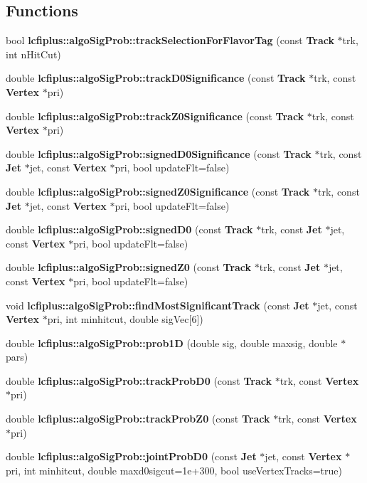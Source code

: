 \subsection*{Functions}
\begin{DoxyCompactItemize}
\item 
bool {\bf lcfiplus\-::algo\-Sig\-Prob\-::track\-Selection\-For\-Flavor\-Tag} (const {\bf Track} $\ast$trk, int n\-Hit\-Cut)
\item 
double {\bf lcfiplus\-::algo\-Sig\-Prob\-::track\-D0\-Significance} (const {\bf Track} $\ast$trk, const {\bf Vertex} $\ast$pri)
\item 
double {\bf lcfiplus\-::algo\-Sig\-Prob\-::track\-Z0\-Significance} (const {\bf Track} $\ast$trk, const {\bf Vertex} $\ast$pri)
\item 
double {\bf lcfiplus\-::algo\-Sig\-Prob\-::signed\-D0\-Significance} (const {\bf Track} $\ast$trk, const {\bf Jet} $\ast$jet, const {\bf Vertex} $\ast$pri, bool update\-Flt=false)
\item 
double {\bf lcfiplus\-::algo\-Sig\-Prob\-::signed\-Z0\-Significance} (const {\bf Track} $\ast$trk, const {\bf Jet} $\ast$jet, const {\bf Vertex} $\ast$pri, bool update\-Flt=false)
\item 
double {\bf lcfiplus\-::algo\-Sig\-Prob\-::signed\-D0} (const {\bf Track} $\ast$trk, const {\bf Jet} $\ast$jet, const {\bf Vertex} $\ast$pri, bool update\-Flt=false)
\item 
double {\bf lcfiplus\-::algo\-Sig\-Prob\-::signed\-Z0} (const {\bf Track} $\ast$trk, const {\bf Jet} $\ast$jet, const {\bf Vertex} $\ast$pri, bool update\-Flt=false)
\item 
void {\bf lcfiplus\-::algo\-Sig\-Prob\-::find\-Most\-Significant\-Track} (const {\bf Jet} $\ast$jet, const {\bf Vertex} $\ast$pri, int minhitcut, double sig\-Vec[6])
\item 
double {\bf lcfiplus\-::algo\-Sig\-Prob\-::prob1\-D} (double sig, double maxsig, double $\ast$pars)
\item 
double {\bf lcfiplus\-::algo\-Sig\-Prob\-::track\-Prob\-D0} (const {\bf Track} $\ast$trk, const {\bf Vertex} $\ast$pri)
\item 
double {\bf lcfiplus\-::algo\-Sig\-Prob\-::track\-Prob\-Z0} (const {\bf Track} $\ast$trk, const {\bf Vertex} $\ast$pri)
\item 
double {\bf lcfiplus\-::algo\-Sig\-Prob\-::joint\-Prob\-D0} (const {\bf Jet} $\ast$jet, const {\bf Vertex} $\ast$pri, int minhitcut, double maxd0sigcut=1e+300, bool use\-Vertex\-Tracks=true)
\item 

\end{DoxyCompactItemize}
